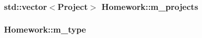 \subsubsection[{\texorpdfstring{m\+\_\+projects}{m_projects}}]{\setlength{\rightskip}{0pt plus 5cm}std\+::vector$<${\bf Project}$>$ Homework\+::m\+\_\+projects\hspace{0.3cm}{\ttfamily [private]}}\hypertarget{class_homework_a7d9479cfebf02074e2ac340561f7fb8e}{}\label{class_homework_a7d9479cfebf02074e2ac340561f7fb8e}
\subsubsection[{\texorpdfstring{m\+\_\+type}{m_type}}]{ Homework\+::m\+\_\+type\hspace{0.3cm}{\ttfamily [private]}}\hypertarget{class_homework_a2a684368d7bdfaa95ee102e4fa6372ba}{}\label{class_homework_a2a684368d7bdfaa95ee102e4fa6372ba}
